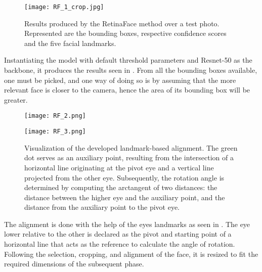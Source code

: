 \documentclass[class=report, crop=false, a4paper, 12pt]{standalone}
\begin{document}
\begin{figure}[!h]
    \centering
    \texttt{[image: RF\_1\_crop.jpg]}
    \caption[Results produced by the RetinaFace method over a test photo.]{Results produced by the RetinaFace method over a test photo. Represented are the bounding boxes, respective confidence scores and the five facial landmarks.}
    \label{fig:rf_1}
\end{figure}

Instantiating the model with default threshold parameters and Resnet-50 as the backbone, it produces the results seen in . From all the bounding boxes available, one must be picked, and one way of doing so is by assuming that the more relevant face is closer to the camera, hence the area of its bounding box will be greater.

\begin{figure}[H]
    \centering
    \begin{minipage}[c]{0.48\textwidth}
      \centering
      \texttt{[image: RF\_2.png]}
      \label{fig:rf_2}
    \end{minipage}
    \hfill
    \begin{minipage}[c]{0.48\textwidth}
      \centering
      \texttt{[image: RF\_3.png]}
      \label{fig:rf_3}
    \end{minipage} 
    \caption[Visualization of the developed landmark-based alignment.]{Visualization of the developed landmark-based alignment. The green dot serves as an auxiliary point, resulting from the intersection of a horizontal line originating at the pivot eye and a vertical line projected from the other eye. Subsequently, the rotation angle is determined by computing the arctangent of two distances: the distance between the higher eye and the auxiliary point, and the distance from the auxiliary point to the pivot eye.}
    \label{fig:rf_2_3}
\end{figure}

\par The alignment is done with the help of the eyes landmarks as seen in . The eye lower relative to the other is declared as the pivot and starting point of a horizontal line that acts as the reference to calculate the angle of rotation. Following the selection, cropping, and alignment of the face, it is resized to fit the required dimensions of the subsequent phase.
\end{document}
